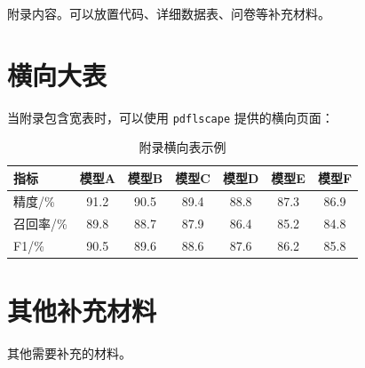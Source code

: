 
附录内容。可以放置代码、详细数据表、问卷等补充材料。

\section{横向大表}

当附录包含宽表时，可以使用 \texttt{pdflscape} 提供的横向页面：

\begin{landscape}
\begin{table}[H]
    \centering
    \caption{附录横向表示例}
    \label{tab:appendix-landscape}
    \begin{tabular}{lcccccc}
        \toprule
        指标 & 模型A & 模型B & 模型C & 模型D & 模型E & 模型F \\
        \midrule
        精度/\si{\percent} & 91.2 & 90.5 & 89.4 & 88.8 & 87.3 & 86.9 \\
        召回率/\si{\percent} & 89.8 & 88.7 & 87.9 & 86.4 & 85.2 & 84.8 \\
        F1/\si{\percent} & 90.5 & 89.6 & 88.6 & 87.6 & 86.2 & 85.8 \\
        \bottomrule
    \end{tabular}
\end{table}
\end{landscape}

\section{其他补充材料}

其他需要补充的材料。
